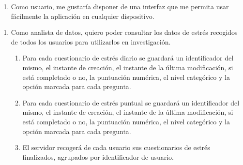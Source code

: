         \begin{enumerate}[resume=req-usuario,label=\textbf{\texttt{RU-\arabic*}}]
            \item Como usuario, me gustaría disponer de una interfaz que me permita usar fácilmente la aplicación en cualquier dispositivo.
        \end{enumerate}
        \begin{enumerate}[resume=req-usuario,label=\textbf{\texttt{RU-\arabic*}}]
            \item Como analista de datos, quiero poder consultar los datos de estrés recogidos de todos los usuarios para utilizarlos en investigación.
            \begin{enumerate}[resume=req-funcionales,label=\textbf{\texttt{RF-\arabic*}}]
                 \item Para cada cuestionario de estrés diario se guardará un identificador del mismo, el instante de creación, el instante de la última modificación, si está completado o no, la puntuación numérica, el nivel categórico y la opción marcada para cada pregunta.
                \item Para cada cuestionario de estrés puntual se guardará un identificador del mismo, el instante de creación, el instante de la última modificación, si está completado o no, la puntuación numérica, el nivel categórico y la opción marcada para cada pregunta.
                \item El servidor recogerá de cada usuario sus cuestionarios de estrés finalizados, agrupados por identificador de usuario.
            \end{enumerate}
        \end{enumerate}
